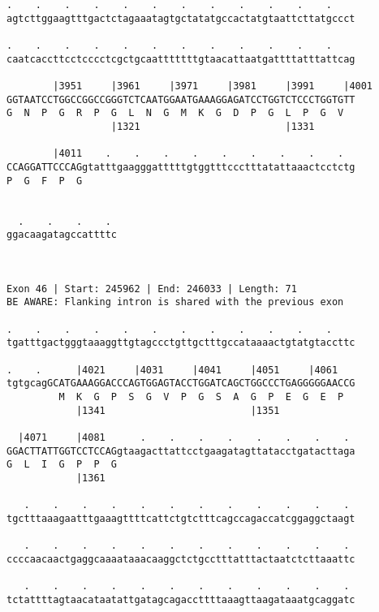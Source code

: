 \documentclass{article}
\begin{document}
\begin{Verbatim}
.    .    .    .    .    .    .    .    .    .    .    .    
agtcttggaagtttgactctagaaatagtgctatatgccactatgtaattcttatgccct
                                                            
.    .    .    .    .    .    .    .    .    .    .    .    
caatcaccttcctcccctcgctgcaatttttttgtaacattaatgattttatttattcag
                                                            
        |3951     |3961     |3971     |3981     |3991     |4001
GGTAATCCTGGCCGGCCGGGTCTCAATGGAATGAAAGGAGATCCTGGTCTCCCTGGTGTT
G  N  P  G  R  P  G  L  N  G  M  K  G  D  P  G  L  P  G  V  
                  |1321                         |1331       
  
        |4011    .    .    .    .    .    .    .    .    .  
CCAGGATTCCCAGgtatttgaagggatttttgtggtttccctttatattaaactcctctg
P  G  F  P  G                                               
                                                            
  
  .    .    .    . 
ggacaagatagccattttc
                   
                   
 
Exon 46 | Start: 245962 | End: 246033 | Length: 71
BE AWARE: Flanking intron is shared with the previous exon
 
.    .    .    .    .    .    .    .    .    .    .    .    
tgatttgactgggtaaaggttgtagccctgttgctttgccataaaactgtatgtaccttc
                                                            
.    .      |4021     |4031     |4041     |4051     |4061   
tgtgcagGCATGAAAGGACCCAGTGGAGTACCTGGATCAGCTGGCCCTGAGGGGGAACCG
         M  K  G  P  S  G  V  P  G  S  A  G  P  E  G  E  P  
            |1341                         |1351             
  
  |4071     |4081      .    .    .    .    .    .    .    . 
GGACTTATTGGTCCTCCAGgtaagacttattcctgaagatagttatacctgatacttaga
G  L  I  G  P  P  G                                         
            |1361                                           
  
   .    .    .    .    .    .    .    .    .    .    .    . 
tgctttaaagaatttgaaagttttcattctgtctttcagccagaccatcggaggctaagt
                                                            
   .    .    .    .    .    .    .    .    .    .    .    . 
ccccaacaactgaggcaaaataaacaaggctctgcctttatttactaatctcttaaattc
                                                            
   .    .    .    .    .    .    .    .    .    .    .    . 
tctattttagtaacataatattgatagcagaccttttaaagttaagataaatgcaggatc
                                                            

\end{Verbatim}
\end{document}

